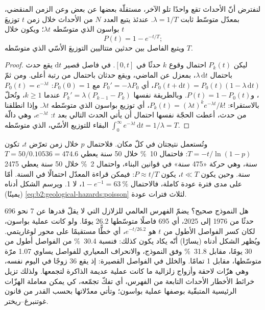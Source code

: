 \begin{proposition}\label{prop:b2:geological-hazards:poisson}
لنفترض أنّ الأحداث تقع واحدًا تلو الآخر، مستقلّة بعضها عن
بعض وعن الزمن المنقضي، بمعدّل متوسّط ثابت $\lambda = 1/T$. عندئذ يتبع العدد $N$ من
الأحداث خلال زمن $t$ توزيعَ بواسون الذي متوسّطه $\lambda t$؛ ويكون  خلال $t$
\begin{equation}
P(t) = 1 - e^{-t/T};
\label{eq:b2:geological-hazards:poisson}
\end{equation}
ويتبع الفاصل بين حدثين متتاليين التوزيعَ الأسّي الذي متوسّطه $T$.
\end{proposition}

\begin{proof}
ليكن $P_k(t)$ احتمال وقوع $k$ حدثًا في $[0, t]$. في فاصل قصير $\mathrm{d}t$ يقع
حدث باحتمال $\lambda\,\mathrm{d}t$، بمعزل عن الماضي، ويقع حدثان باحتمال
من رتبة أعلى. ومن ثمّ $P_0(t + \mathrm{d}t) = P_0(t)(1 - \lambda\,\mathrm{d}t)$، أي
$P_0' = -\lambda P_0$ مع $P_0(0) = 1$: $P_0(t) = e^{-\lambda t}$، و$P(t) = 1 - P_0(t)$. وبالطريقة
نفسها $P_k' = \lambda(P_{k-1} - P_k)$ عندما $k \geq 1$، وتُحلّ بالاستقراء:
$P_k(t) = (\lambda t)^k e^{-\lambda t}/k!$، أي توزيع بواسون الذي متوسّطه $\lambda t$. وإذا انطلقنا من
حدث، أعطت الحجّة نفسها احتمال أن يأتي الحدث التالي بعد $t$:
$e^{-\lambda t}$، وهي دالّة البقاء للتوزيع الأسّي، الذي متوسّطه
$\int_0^\infty e^{-\lambda t}\,\mathrm{d}t = 1/\lambda = T$.
\end{proof}

وتُستعمل نتيجتان في كلّ مكان. فلاحتمال $p$ خلال زمن تعرّض $t$، تكون  $T = -t/\ln(1 - p)$: فاحتمال \qty{10}{\percent} خلال 50 سنة يعطي $T = 50/0.10536 =
474.6$ سنة، وهي حركة «475 سنة» في قوانين البناء، واحتمال \qty{2}{\percent} خلال 50 سنة
يعطي 2475 سنة. وحين يكون $t \ll T$، يكون $P \approx t/T$: فيمكن قراءة المعدّل
احتمالًا في السنة. أمّا على مدى فترة عودة كاملة، فالاحتمال $1 - e^{-1} =
\qty{63}{\percent}$، لا 1. ويرسم الشكل أدناه (يمينًا) \eqref{eq:b2:geological-hazards:poisson}
لثلاث فترات عودة.

هل النموذج صحيح؟ يضمّ الفهرس العالمي للزلازل التي لا يقلّ قدرها عن 7 نحو 696 حدثًا
من 1976 إلى 2025، أي 695 فاصلًا متوسّطها 26.2 يومًا. ولو كانت عملية بواسون،
لكان كسر الفواصل الأطول من $t$ هو $e^{-t/26.2}$، أي خطًّا مستقيمًا على محور
لوغاريتمي. ويُظهر الشكل أدناه (يسارًا) أنّه يكاد يكون كذلك: فنسبة \qty{30.4}{\percent} من الفواصل
أطول من 30 يومًا، مقابل \qty{31.8}{\percent} وفق النموذج، والانحراف المعياري
للفواصل يساوي 1.07 مرّة متوسّطها، مقابل 1 تمامًا. والخلل في الفواصل القصيرة: إذ يقع 36 زوجًا
في اليوم نفسه، وهي هزّات لاحقة وأزواج زلزالية ما كانت عملية عديمة الذاكرة لتجمعها. ولذلك
تزيل خرائط الأخطار الأحداث التابعة من الفهرس، أي تفكّ تجمّعه، كي يمكن
معاملة الهزّات الرئيسية المتبقّية بوصفها عملية بواسون؛ وتأتي معدّلاتها بحسب القدر من
قانون غوتنبرغ--ريختر.

